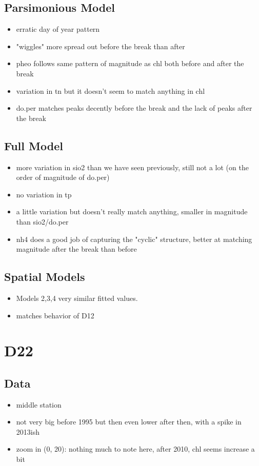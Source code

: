 \documentclass[12pt]{amsart}
\begin{document}
\subsection{Parsimonious Model}
\begin{itemize}
\item erratic day of year pattern
\item "wiggles" more spread out before the break than after
\item pheo follows same pattern of magnitude as chl both before and after the break
\item variation in tn but it doesn't seem to match anything in chl
\item do.per matches peaks decently before the break and the lack of peaks after the break
\end{itemize}
\subsection{Full Model}
\begin{itemize}
\item more variation in sio2 than we have seen previously, still not a lot (on the order of magnitude of do.per)
\item no variation in tp
\item a little variation but doesn't really match anything, smaller in magnitude than sio2/do.per
\item nh4 does a good job of capturing the "cyclic" structure, better at matching magnitude after the break than before
\end{itemize}

\subsection{Spatial Models}

\begin{itemize}
\item Models 2,3,4 very similar fitted values.
\item matches behavior of D12
\end{itemize}



\section{D22}
\subsection{Data}
\begin{itemize}
\item middle station
\item not very big before 1995 but then even lower after then, with a spike in 2013ish
\item zoom in (0, 20): nothing much to note here, after 2010, chl seems increase a bit
\end{itemize}
\end{document}
